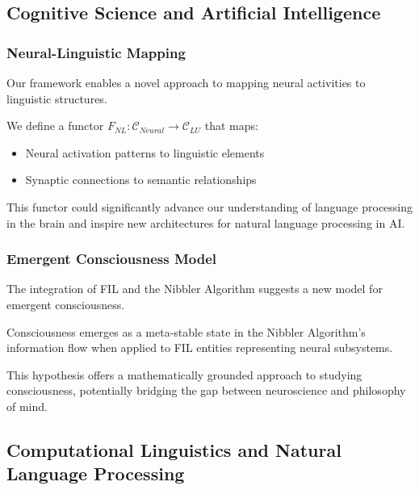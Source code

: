 \subsection{Cognitive Science and Artificial Intelligence}

\subsubsection{Neural-Linguistic Mapping}

Our framework enables a novel approach to mapping neural activities to linguistic structures.

\begin{definition}
We define a functor $F_{NL}: \mathcal{C}_{Neural} \to \mathcal{C}_{LU}$ that maps:
\begin{itemize}
    \item Neural activation patterns to linguistic elements
    \item Synaptic connections to semantic relationships
\end{itemize}
\end{definition}

This functor could significantly advance our understanding of language processing in the brain and inspire new architectures for natural language processing in AI.

\subsubsection{Emergent Consciousness Model}

The integration of FIL and the Nibbler Algorithm suggests a new model for emergent consciousness.

\begin{hypothesis}
Consciousness emerges as a meta-stable state in the Nibbler Algorithm's information flow when applied to FIL entities representing neural subsystems.
\end{hypothesis}

This hypothesis offers a mathematically grounded approach to studying consciousness, potentially bridging the gap between neuroscience and philosophy of mind.

\subsection{Computational Linguistics and Natural Language Processing}

